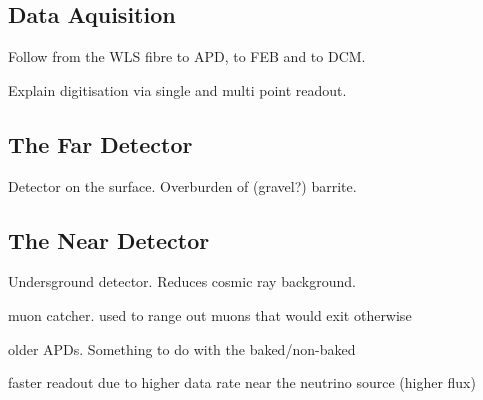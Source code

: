 

\subsection{Data Aquisition}

Follow from the WLS fibre to APD, to FEB and to DCM.

Explain digitisation via single and multi point readout.


\subsection{The Far Detector}\label{sec:fardet}

Detector on the surface. Overburden of (gravel?) barrite.

\subsection{The Near Detector}\label{sec:neardet}

Undersground detector. Reduces cosmic ray background.

muon catcher. used to range out muons that would exit otherwise

older APDs. Something to do with the baked/non-baked

faster readout due to higher data rate near the neutrino source
(higher flux)